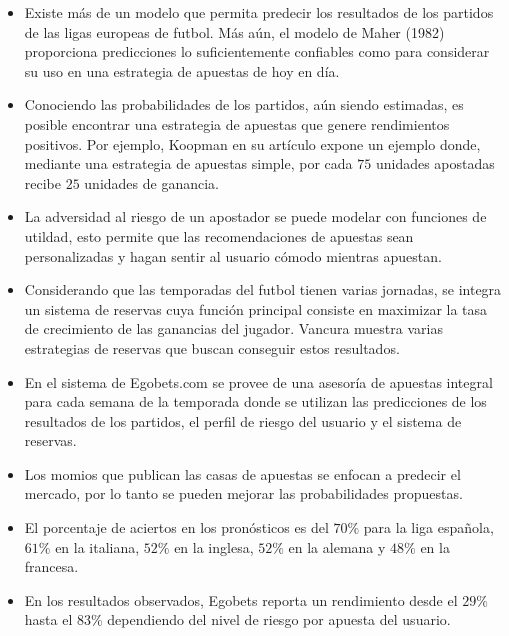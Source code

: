 \begin{itemize}


	\item Existe más de un modelo que permita predecir los resultados de los partidos de las ligas europeas de futbol. Más aún, el modelo de Maher (1982)\cite{maher1982modelling} proporciona predicciones lo suficientemente confiables como para considerar su uso en una estrategia de apuestas de hoy en día.

	\item Conociendo las probabilidades de los partidos, aún siendo estimadas, es posible encontrar una estrategia de apuestas que genere rendimientos positivos. Por ejemplo, Koopman en su artículo \cite{koopman2013dynamic} expone un ejemplo donde, mediante una estrategia de apuestas simple, por cada $75$ unidades apostadas recibe $25$ unidades de ganancia.

	\item La adversidad al riesgo de un apostador se puede modelar con funciones de utildad, esto permite que las recomendaciones de apuestas sean personalizadas y hagan sentir al usuario cómodo mientras apuestan.
	
	\item Considerando que las temporadas del futbol tienen varias jornadas, se integra un sistema de reservas cuya función principal consiste en maximizar la tasa de crecimiento de las ganancias del jugador. Vancura \cite{vancura2000finding} muestra varias estrategias de reservas que buscan conseguir estos resultados.

\item En el sistema de Egobets.com se provee de una asesoría de apuestas integral para cada semana de la temporada donde se utilizan las predicciones de los resultados de los partidos, el perfil de riesgo del usuario y el sistema de reservas.

\item Los momios que publican las casas de apuestas se enfocan a predecir el mercado, por lo tanto se pueden mejorar las probabilidades propuestas.

\item  El porcentaje de aciertos en los pronósticos es del $70\%$ para la liga española, $61\%$ en la italiana, $52\%$ en la inglesa, $52\%$ en la alemana y $48\%$ en la francesa.

\item En los resultados observados, Egobets reporta un rendimiento desde el $29\%$ hasta el $83\%$ dependiendo del nivel de riesgo por apuesta del usuario.


\end{itemize}
